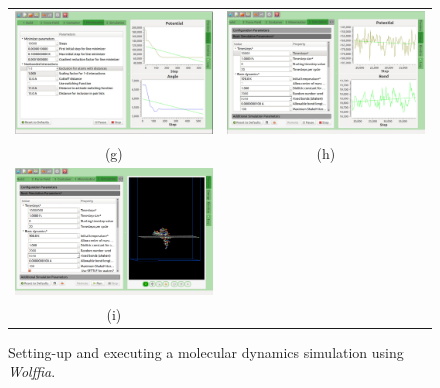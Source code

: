 \documentclass{article}
\begin{document}
\begin{figure}
\begin{center}
\begin{tabular}{cc}
     \includegraphics[scale=0.20]{07-Minimization.png} &\includegraphics[scale=0.19]{08-Simulation.png} \\
     (g) & (h)\\
      \includegraphics[scale=0.20]{09-Result.png}\\
      (i) \\
  \end{tabular}
  \caption{Setting-up and executing a molecular dynamics simulation using \textit{Wolffia}.}
  \label{fig:testCase}

\end{center}\end{figure}
\end{document}

